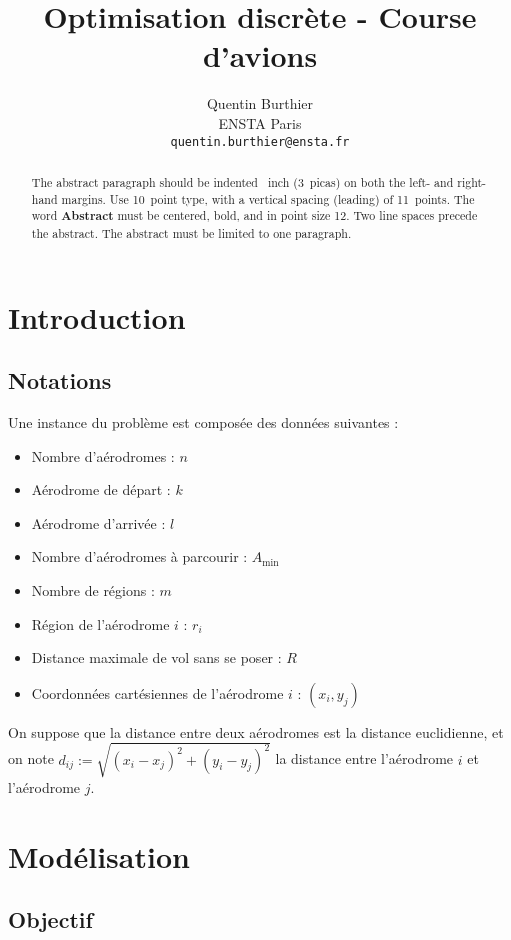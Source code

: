 \documentclass{article}
\title{Optimisation discrète - Course d'avions}
\author{%
  Quentin Burthier
  \\
  ENSTA Paris\\
  \texttt{quentin.burthier@ensta.fr} \\
}
\newcommand{\dij}{d_{ij}}
\newcommand{\Amin}{A_\text{min}}
\begin{document}
\maketitle

\begin{abstract}
  The abstract paragraph should be indented ~inch (3~picas) on
  both the left- and right-hand margins. Use 10~point type, with a vertical
  spacing (leading) of 11~points.  The word \textbf{Abstract} must be centered,
  bold, and in point size 12. Two line spaces precede the abstract. The abstract
  must be limited to one paragraph.
\end{abstract}

\section{Introduction}

\subsection{Notations}

Une instance du problème est composée des données suivantes :
\begin{itemize}
  \item Nombre d'aérodromes : $n$
  \item Aérodrome de départ : $k$
  \item Aérodrome d'arrivée : $l$
  \item Nombre d'aérodromes à parcourir : $\Amin$
  \item Nombre de régions : $m$
  \item Région de l'aérodrome $i$ : $r_i$
  \item Distance maximale de vol sans se poser : $R$
  \item Coordonnées cartésiennes de l'aérodrome $i$ : $(x_i, y_j)$
\end{itemize}

On suppose que la distance entre deux aérodromes est la distance euclidienne, et 
on note $\dij := \sqrt{(x_i - x_j)^2 + (y_i - y_j)^2}$ la distance entre 
l'aérodrome $i$ et l'aérodrome $j$.

\section{Modélisation}

\subsection{Objectif}
\end{document}
